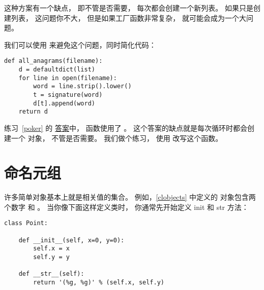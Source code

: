 这种方案有一个缺点， 即不管是否需要， 每次都会创建一个新列表。  
如果只是创建列表， 这问题你不大， 但是如果工厂函数非常复杂， 就可能会成为一个大问题。


我们可以使用  来避免这个问题，同时简化代码：

\begin{lstlisting}
def all_anagrams(filename):
    d = defaultdict(list)
    for line in open(filename):
        word = line.strip().lower()
        t = signature(word)
        d[t].append(word)
    return d
\end{lstlisting}


练习~\ref{poker} 的 \href{http://thinkpython2.com/code/PokerHandSoln.py}{答案}中，  函数使用了 。  
这个答案的缺点就是每次循环时都会创建一个  对象， 不管是否需要。  
我们做个练习， 使用  改写这个函数。


\section{命名元组}


许多简单对象基本上就是相关值的集合。  
例如，\ref{clobjects} 中定义的  对象包含两个数字  和  。  
当你像下面这样定义类时， 你通常先开始定义 init 和 str 方法：

\begin{lstlisting}
class Point:

    def __init__(self, x=0, y=0):
        self.x = x
        self.y = y

    def __str__(self):
        return '(%g, %g)' % (self.x, self.y)
\end{lstlisting}


